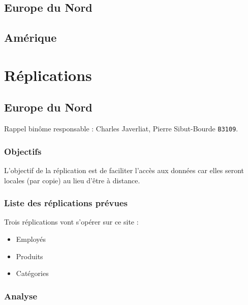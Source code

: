 \documentclass[10pt,a4paper]{article}
\theoremstyle{plain}
\begin{document}
\subsection{Europe du Nord}
%
\newpage

\subsection{Amérique}
%
\newpage

\section{Réplications}
\subsection{Europe du Nord}
Rappel binôme responsable : Charles Javerliat, Pierre Sibut-Bourde \verb|B3109|.
\subsubsection{Objectifs}
L’objectif de la réplication est de faciliter l’accès aux données car elles seront locales (par copie) au lieu d'être à distance.

\subsubsection{Liste des réplications prévues}
Trois réplications vont s'opérer sur ce site :
\begin{itemize}
    \item Employés
    \item Produits
    \item Catégories
\end{itemize}

\subsubsection{Analyse}
%
\end{document}
